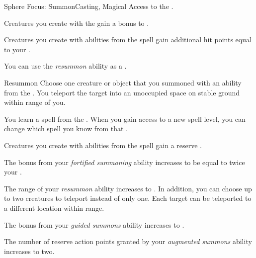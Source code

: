     \begin{feat}{Sphere Focus: Summon}{Casting, Magical}
        \featpre Access to the  .

         Creatures you create with the   gain a  bonus to .

         Creatures you create with abilities from the  spell gain additional hit points equal to your .

         You can use the \textit{resummon} ability as a .
        \begin{freeability}{Resummon}
            Choose one creature or object that you summoned with an ability from the  .
            You teleport the target into an unoccupied space on stable ground within \rngmed range of you.
        \end{freeability}

         You learn a spell from the  .
        When you gain access to a new spell level, you can change which spell you know from that .

         Creatures you create with abilities from the  spell gain a reserve .

         The bonus from your \textit{fortified summoning} ability increases to be equal to twice your .

         The range of your \textit{resummon} ability increases to \rnglong.
        In addition, you can choose up to two creatures to teleport instead of only one.
        Each target can be teleported to a different location within range.

         The bonus from your \textit{guided summons} ability increases to .

         The number of reserve action points granted by your \textit{augmented summons} ability increases to two.
    \end{feat}

